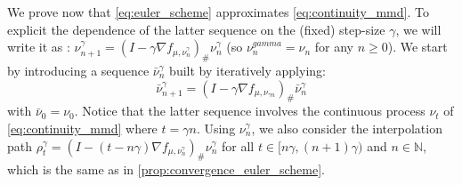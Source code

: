 We  prove now that \cref{eq:euler_scheme} approximates \cref{eq:continuity_mmd}. To explicit the dependence of the latter sequence on the (fixed) step-size $\gamma$, we will write it as : $\nu_{n+1}^{\gamma} =(I-\gamma\nabla f_{\mu,\nu_n^{\gamma}})_{\#}\nu_{n}^{\gamma}$ (so $\nu_n^{gamma}=\nu_n$ for any $n \ge 0$). We start by introducing a sequence $\bar{\nu}_{n}^{\gamma}$ built by iteratively applying: 
 \begin{equation}\label{eq:intermed_process_time}
 \bar{\nu}_{n+1}^{\gamma} =(I-\gamma\nabla f_{\mu,\nu_{\gamma n}})_{\#}\bar{\nu}_{n}^{\gamma}
  \end{equation}
 with $\bar{\nu}_{0}=\nu_{0}$. Notice that the latter sequence involves the continuous process $\nu_t$ of \eqref{eq:continuity_mmd} where $t=\gamma n$. Using $\nu_n^{\gamma}$, we also consider the interpolation path $\rho_{t}^{\gamma}=(I-(t-n\gamma)\nabla f_{\mu,\nu_{n}^{\gamma}})_{\#}\nu_{n}^{\gamma}$ for all $t\in[n\gamma,(n+1)\gamma)$ and $n\in \mathbb{N}$, which is the same as in \cref{prop:convergence_euler_scheme}. 
